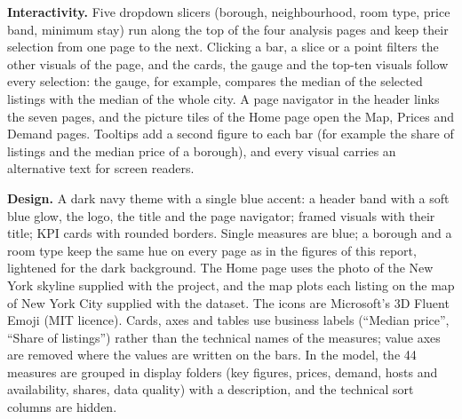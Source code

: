 \documentclass[12pt,a4paper]{article}
\begin{document}
\textbf{Interactivity.} Five dropdown slicers (borough, neighbourhood, room type, price band, minimum
stay) run along the top of the four analysis pages and keep their selection from one page to the next.
Clicking a bar, a slice or a point filters the other visuals of the page, and the cards, the gauge and
the top-ten visuals follow every selection: the gauge, for example, compares the median of the selected
listings with the median of the whole city. A page navigator in the header links the seven pages, and
the picture tiles of the Home page open the Map, Prices and Demand pages. Tooltips add a second figure to each bar (for example the share of listings and the median price of a borough), and every visual carries an alternative text for screen readers.

\textbf{Design.} A dark navy theme with a single blue accent: a header band with a soft blue glow, the
logo, the title and the page navigator; framed visuals with their title; KPI cards with rounded borders.
Single measures are blue; a borough and a room type keep the same hue on every page as in the figures of
this report, lightened for the dark background. The Home page uses the photo of the New York skyline
supplied with the project, and the map plots each listing on the map of New York City supplied with the
dataset. The icons are Microsoft's 3D Fluent Emoji (MIT licence).
Cards, axes and tables use business labels (``Median price'', ``Share of listings'') rather than the technical
names of the measures; value axes are removed where the values are written on the bars. In the model, the
44 measures are grouped in display folders (key figures, prices, demand, hosts and availability, shares,
data quality) with a description, and the technical sort columns are hidden.
\end{document}
